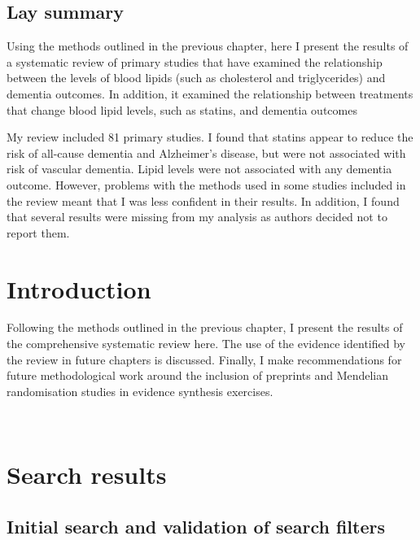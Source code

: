 \documentclass[a4paper, twoside]{templates/ociamthesis}
\begin{document}
\begin{laybox}

\hypertarget{lay-summary-3}{%
\section*{Lay summary}\label{lay-summary-3}}

Using the methods outlined in the previous chapter, here I present the results of a systematic review of primary studies that have examined the relationship between the levels of blood lipids (such as cholesterol and triglycerides) and dementia outcomes. In addition, it examined the relationship between treatments that change blood lipid levels, such as statins, and dementia outcomes

My review included 81 primary studies. I found that statins appear to reduce the risk of all-cause dementia and Alzheimer's disease, but were not associated with risk of vascular dementia. Lipid levels were not associated with any dementia outcome. However, problems with the methods used in some studies included in the review meant that I was less confident in their results. In addition, I found that several results were missing from my analysis as authors decided not to report them.

\end{laybox}

\hypertarget{introduction-1}{%
\section{Introduction}\label{introduction-1}}

Following the methods outlined in the previous chapter, I present the results of the comprehensive systematic review here. The use of the evidence identified by the review in future chapters is discussed. Finally, I make recommendations for future methodological work around the inclusion of preprints and Mendelian randomisation studies in evidence synthesis exercises.

~

\hypertarget{search-results}{%
\section{Search results}\label{search-results}}

\hypertarget{initial-search-and-validation-of-search-filters}{%
\subsection{Initial search and validation of search filters}\label{initial-search-and-validation-of-search-filters}}
\end{document}
